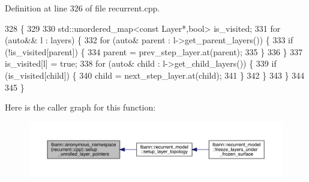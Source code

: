 Definition at line 326 of file recurrent.\+cpp.


\begin{DoxyCode}
328                                                                                                  \{
329 
330   std::unordered\_map<const Layer*,bool> is\_visited;
331   \textcolor{keywordflow}{for} (\textcolor{keyword}{auto}&& l : layers) \{
332     \textcolor{keywordflow}{for} (\textcolor{keyword}{auto}& parent : l->get\_parent\_layers()) \{
333       \textcolor{keywordflow}{if} (!is\_visited[parent]) \{
334         parent = prev\_step\_layer.at(parent);
335       \}
336     \}
337     is\_visited[l] = \textcolor{keyword}{true};
338     \textcolor{keywordflow}{for} (\textcolor{keyword}{auto}& child : l->get\_child\_layers()) \{
339       \textcolor{keywordflow}{if} (is\_visited[child]) \{
340         child = next\_step\_layer.at(child);
341       \}
342     \}
343   \}
344   
345 \}
\end{DoxyCode}
Here is the caller graph for this function\+:\nopagebreak
\begin{figure}[H]
\begin{center}
\leavevmode
\includegraphics[width=350pt]{namespacelbann_1_1anonymous__namespace_02recurrent_8cpp_03_a12a6f96a1c15c91218169bf7157cd800_icgraph}
\end{center}
\end{figure}
\mbox{\label{namespacelbann_1_1anonymous__namespace_02recurrent_8cpp_03_a8c76387c2dd531058700ad9a41cd093a}} 

